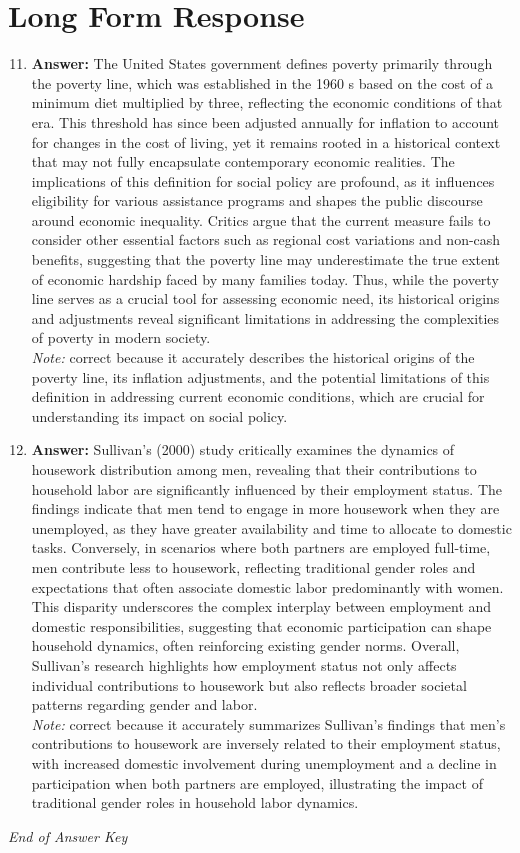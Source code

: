 \documentclass[12pt]{article}
\begin{document}
\section*{Long Form Response}
\begin{enumerate}[label=\arabic*.]
\setcounter{enumi}{10}
\item \textbf{Answer:} The United States government defines poverty primarily through the poverty line, which was established in the 1960 s based on the cost of a minimum diet multiplied by three, reflecting the economic conditions of that era. This threshold has since been adjusted annually for inflation to account for changes in the cost of living, yet it remains rooted in a historical context that may not fully encapsulate contemporary economic realities. The implications of this definition for social policy are profound, as it influences eligibility for various assistance programs and shapes the public discourse around economic inequality. Critics argue that the current measure fails to consider other essential factors such as regional cost variations and non-cash benefits, suggesting that the poverty line may underestimate the true extent of economic hardship faced by many families today. Thus, while the poverty line serves as a crucial tool for assessing economic need, its historical origins and adjustments reveal significant limitations in addressing the complexities of poverty in modern society.
\\ \textit{Note:} correct because it accurately describes the historical origins of the poverty line, its inflation adjustments, and the potential limitations of this definition in addressing current economic conditions, which are crucial for understanding its impact on social policy.
\item \textbf{Answer:} Sullivan's (2000) study critically examines the dynamics of housework distribution among men, revealing that their contributions to household labor are significantly influenced by their employment status. The findings indicate that men tend to engage in more housework when they are unemployed, as they have greater availability and time to allocate to domestic tasks. Conversely, in scenarios where both partners are employed full-time, men contribute less to housework, reflecting traditional gender roles and expectations that often associate domestic labor predominantly with women. This disparity underscores the complex interplay between employment and domestic responsibilities, suggesting that economic participation can shape household dynamics, often reinforcing existing gender norms. Overall, Sullivan's research highlights how employment status not only affects individual contributions to housework but also reflects broader societal patterns regarding gender and labor.
\\ \textit{Note:} correct because it accurately summarizes Sullivan's findings that men's contributions to housework are inversely related to their employment status, with increased domestic involvement during unemployment and a decline in participation when both partners are employed, illustrating the impact of traditional gender roles in household labor dynamics.
\end{enumerate}

\vfill
\noindent\textit{End of Answer Key}
\end{document}
